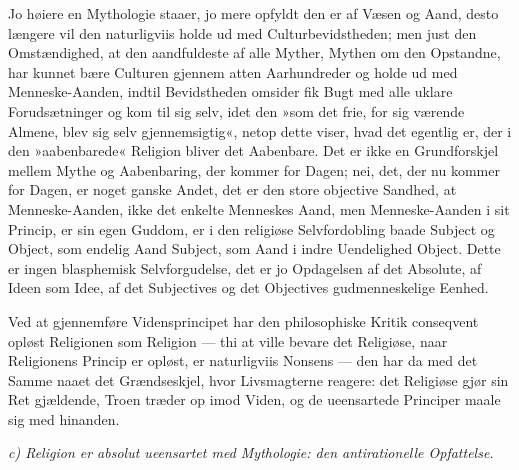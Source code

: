 \documentclass[12pt,a4paper]{article}
\begin{document}
Jo høiere en Mythologie staaer, jo mere opfyldt den er af Væsen
og Aand, desto længere vil den naturligviis holde ud med
Culturbevidstheden; men just den Omstændighed, at den
aandfuldeste af alle Myther, Mythen om den Opstandne, har kunnet
bære Culturen gjennem atten Aarhundreder og holde ud med
Menneske-Aanden, indtil Bevidstheden omsider fik Bugt med alle
uklare Forudsætninger og kom til sig selv, idet den »som det
frie, for sig værende Almene, blev sig selv gjennemsigtig«,
netop dette viser, hvad det egentlig er, der i den
»aabenbarede« Religion bliver det Aabenbare. Det er ikke en
Grundforskjel mellem Mythe og Aabenbaring, der kommer for
Dagen; nei, det, der nu kommer for Dagen, er noget ganske Andet,
det er den store objective Sandhed, at Menneske-Aanden, ikke det
enkelte Menneskes Aand, men Menneske-Aanden i sit Princip, er
sin egen Guddom, er i den religiøse Selvfordobling baade Subject
og Object, som endelig Aand Subject, som Aand i indre
Uendelighed Object. Dette er ingen blasphemisk Selvforgudelse,
det er jo Opdagelsen af det Absolute, af Ideen som Idee, af det
Subjectives og det Objectives gudmenneskelige Eenhed.

Ved at gjennemføre Vidensprincipet har den philosophiske Kritik
conseqvent opløst Religionen som Religion --- thi at ville
bevare det Religiøse, naar Religionens Princip er opløst, er
naturligviis Nonsens --- den har da med det Samme naaet det
Grændseskjel, hvor Livsmagterne reagere: det Religiøse gjør sin
Ret gjældende, Troen træder op imod Viden, og de ueensartede
Principer maale sig med hinanden.

\medskip

\noindent\textit{c) Religion er absolut ueensartet med Mythologie: den antirationelle Opfattelse.}

\medskip
\end{document}
